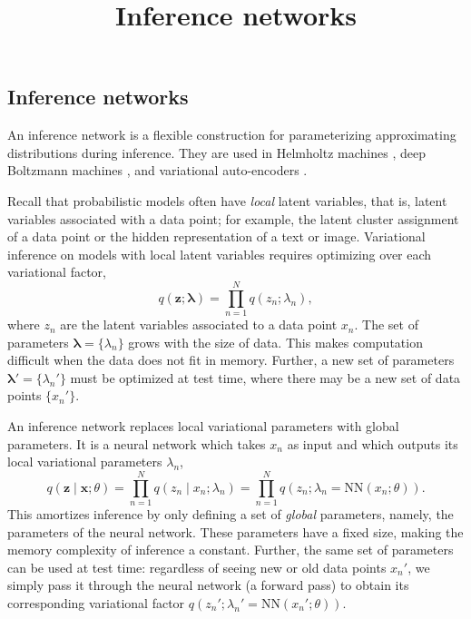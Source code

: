 \title{Inference networks}

\subsection{Inference networks}

An inference network is a flexible construction for parameterizing
approximating distributions during inference.
They are used in Helmholtz machines \citep{dayan1995helmholtz}, deep
Boltzmann machines \citep{salakhutdinov2010efficient}, and
variational auto-encoders \citep{kingma2014auto,rezende2014stochastic}.

Recall that probabilistic models often have \emph{local} latent
variables, that is, latent variables associated with a data point; for
example, the latent cluster assignment of a data point or the hidden
representation of a text or image.
Variational
inference on models with local latent variables
requires optimizing over each variational factor,
\begin{equation*}
q(\mathbf{z}; \mathbf{\lambda}) = \prod_{n=1}^N q(z_n; \lambda_n),
\end{equation*}
where $z_n$ are the latent variables associated to a data point $x_n$.
The set of parameters $\mathbf{\lambda}=\{\lambda_n\}$ grows with the
size of data. This makes computation difficult when the data
does not fit in memory.
Further, a new set of parameters $\mathbf{\lambda}'=\{\lambda_n'\}$
must be optimized at test time, where there may be a new set of data
points $\{x_n'\}$.

An inference network replaces local variational parameters with global
parameters. It is a neural network
which takes $x_n$ as input and which outputs its local variational parameters
$\lambda_n$,
\begin{equation*}
q(\mathbf{z}\mid \mathbf{x}; \theta)
= \prod_{n=1}^N q(z_n \mid x_n; \lambda_n)
= \prod_{n=1}^N q(z_n; \lambda_n = \mathrm{NN}(x_n; \theta)).
\end{equation*}
This amortizes inference by only defining a set of \emph{global} parameters,
namely, the parameters of the neural network. These parameters have a
fixed size, making the memory complexity of inference a constant.
Further, the same set of parameters can be used at test time:
regardless of seeing new or old data points $x_n'$, we simply pass it
through the neural network (a forward pass) to obtain its
corresponding variational factor $q(z_n'; \lambda_n' =
\mathrm{NN}(x_n'; \theta))$.

